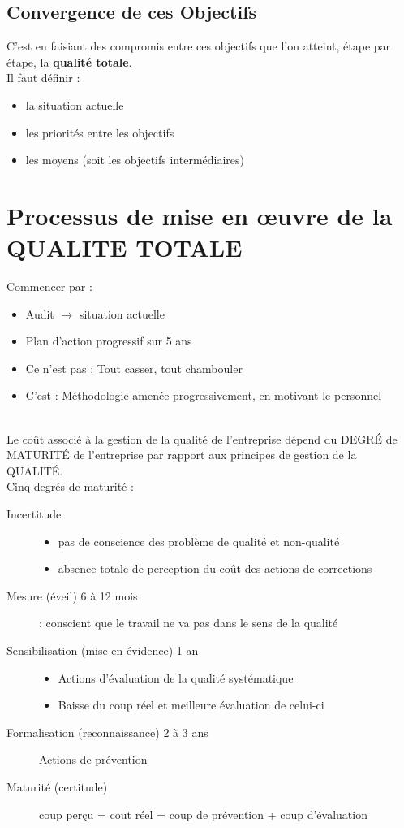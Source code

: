 	\subsection{Convergence de ces Objectifs}
C’est en faisiant des compromis entre ces objectifs que l’on atteint, étape par étape, la \textbf{qualité totale}.\\ 
Il faut définir : 
	\begin{itemize}
	\item la situation actuelle
	\item les priorités entre les objectifs
	\item les moyens (soit les objectifs intermédiaires)
	\end{itemize}


\section{Processus de mise en \oe{}uvre de la QUALITE TOTALE}

Commencer par :
\begin{itemize}
	\item Audit $\rightarrow$ situation actuelle
	\item Plan d'action progressif sur 5 ans
	\item Ce n’est pas : Tout casser, tout chambouler
	\item C’est : Méthodologie amenée progressivement, en motivant le personnel
\end{itemize}
\hfill\\

Le coût associé à la gestion de la qualité de l'entreprise dépend du DEGRÉ de MATURITÉ de l'entreprise par rapport aux principes de gestion de la QUALITÉ.\\
Cinq degrés de maturité :
\begin{description}
\item[Incertitude]
	\begin{itemize}
	\item pas de conscience des problème de qualité et non-qualité
	\item absence totale de perception du coût des actions de corrections
	\end{itemize}
\item[Mesure (éveil) 6 à 12 mois] : conscient que le travail ne va pas dans le sens de la qualité
\item[Sensibilisation (mise en évidence) 1 an]
	\begin{itemize}
	\item Actions d’évaluation de la qualité systématique
	\item Baisse du coup réel et meilleure évaluation de celui-ci
	\end{itemize}
\item[Formalisation (reconnaissance) 2 à 3 ans] Actions de prévention
\item[Maturité (certitude)] coup perçu = cout réel = coup de prévention + coup d’évaluation
\end{description}
\hfill\\

